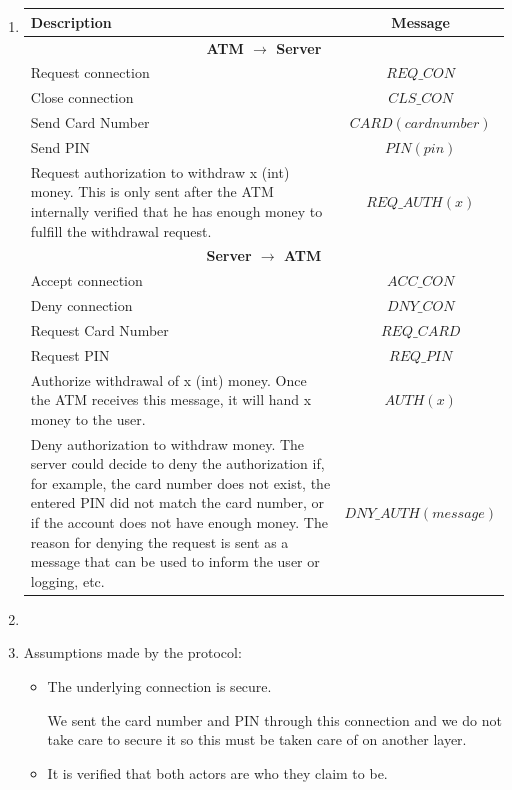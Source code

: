 \documentclass[12pt, a4paper]{article}
\begin{document}
\section{} %
\begin{enumerate}[a]
	\item %
	\begin{tabular}{|p{20em}|c|}
		\hline
		\textbf{Description} & \textbf{Message}\\\hline
		\multicolumn{2}{|c|}{\textbf{ATM $\rightarrow$ Server}}\\\hline
		Request connection & $REQ\_CON$\\\hline
		Close connection & $CLS\_CON$\\\hline
		Send Card Number & $CARD(card number)$\\\hline
		Send PIN & $PIN(pin)$\\\hline
		Request authorization to withdraw x (int) money. This is only sent after the ATM internally verified that he has enough money to fulfill the withdrawal request. & $REQ\_AUTH(x)$\\\hline

		\multicolumn{2}{|c|}{\textbf{Server $\rightarrow$ ATM}}\\\hline
		Accept connection & $ACC\_CON$\\\hline
		Deny connection & $DNY\_CON$\\\hline
		Request Card Number & $REQ\_CARD$\\\hline
		Request PIN & $REQ\_PIN$\\\hline
		Authorize withdrawal of x (int) money. Once the ATM receives this message, it will hand x money to the user. & $AUTH(x)$\\\hline
		Deny authorization to withdraw money. The server could decide to deny the authorization if, for example, the card number does not exist, the entered PIN did not match the card number, or if the account does not have enough money. The reason for denying the request is sent as a message that can be used to inform the user or logging, etc. & $DNY\_AUTH(message)$\\\hline
	\end{tabular}

	\item %
	\item %
	Assumptions made by the protocol:
	\begin{itemize}
		\item The underlying connection is secure.

		We sent the card number and PIN through this connection and we do not take care to secure it so this must be taken care of on another layer.
		\item It is verified that both actors are who they claim to be.


\end{itemize}
\end{enumerate}
\end{document}
